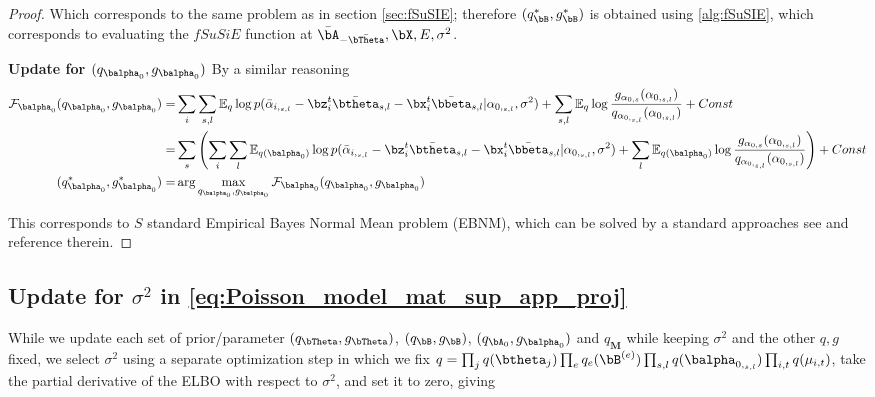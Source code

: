 \begin{proof}
Which corresponds to the same problem as in section \ref{sec:fSuSIE}; therefore $(q_{\bB}^{*},g_{\bB}^*)$ is obtained using \ref{alg:fSuSIE}, which corresponds to evaluating the $fSuSiE$ function at $\bar\bA_{- \bar{\bTheta}}, \bX, E, \sigma^2$.

 
\textbf{Update for $ (q_{\balpha_0},g_{\balpha_0})$}
By a similar reasoning
\begin{align}
  \mathcal F_{\balpha_0}(q_{\balpha_0},g_{\balpha_0})= & \sum_i\sum_{s,l}  \mathbb{E}_q  \log p(\bar{\alpha}_{i,_{s,l}}    - \bz_i^t \Bar{\btheta}_{ s,l} -\bx_i^t\bar{\bbeta}_{s,l}  |  \alpha_{0,_{s,l}},   \sigma^2) +  \sum_{s,l} \mathbb{E}_q  \log \frac{g_{ \alpha_{0,  s  } }  ( \alpha_{0,_{s,l}} ) }{q_{ \alpha_{0,_{s,l}}   } ( \alpha_{0,_{s,l}} )} +Const\\
      =& \sum_{s} \left(\sum_i\sum_{ l}  \mathbb{E}_{q(\balpha_0)} \log p(\bar{\alpha}_{i,_{s,l}}    - \bz_i^t \Bar{\btheta}_{ s,l} -\bx_i^t\bar{\bbeta}_{s,l}  |  \alpha_{0,_{s,l}},   \sigma^2) +  \sum_{ l}\mathbb{E}_{q(\balpha_0)}  \log \frac{g_{ \alpha_{0,  s  } }  ( \alpha_{0,_{s,l}} ) }{q_{ \alpha_{0,_{s,l}}   } ( \alpha_{0,_{s,l}} )} \right) +Const\\
  (q_{\balpha_0}^*,g_{\balpha_0}^*)= &\arg\max_{q_{\balpha_0},g_{\balpha_0}}\mathcal F_{\balpha_0}(q_{\balpha_0},g_{\balpha_0})
\end{align}



This corresponds to $S$ standard Empirical Bayes Normal Mean problem (EBNM), which can be solved by a standard approaches see \cite{willwerscheid_ebnm_2024} and reference therein.




\end{proof}


    \subsection{Update for $\sigma^2$ in  \ref{eq:Poisson_model_mat_sup_app_proj}}\label{subsection:update_s2}
While we update each set of prior/parameter $(q_{\bTheta}, g_{\bTheta})$, $( q_{\bB},  g_{\bB} )$, $( q_{\bA_0},  g_{\balpha_0} )$ and $q_{\bm M}$ while keeping $\sigma^2$ and the other $q,g$ fixed, we select $\sigma^2$ using a separate optimization step in which we fix $q=\prod_jq(\btheta_j)\prod_e q_e(\bB^{(e)})\prod_{s,l}q(\balpha_{0,_{s,l}})\prod_{i,t}q(\mu_{i,t})$, take the partial derivative of the ELBO with respect to $\sigma^2$, and set it to zero, giving
  




